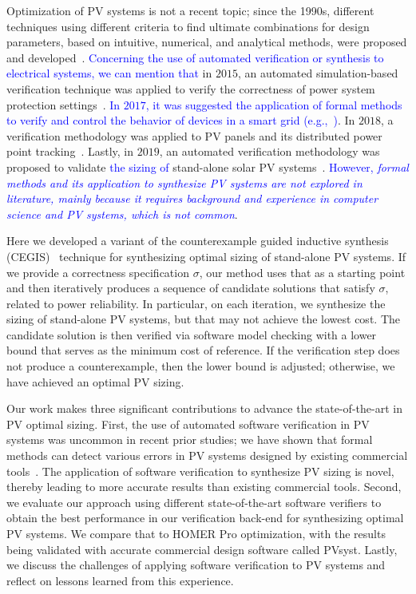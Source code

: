 \documentclass[runningheads]{llncs}
\begin{document}
Optimization of PV systems is not a recent topic; since the 1990s, different techniques using different criteria to find ultimate combinations for design parameters, based on intuitive, numerical, and analytical methods, were proposed and developed~\cite{Alsadi2018}. \textcolor{blue}{Concerning the use of automated verification or synthesis to electrical systems, we can mention that} in $2015$, an automated simulation-based verification technique was applied to verify the correctness of power system protection settings~\cite{Sengupta2015}. \textcolor{blue}{In $2017$, it was suggested the application of formal methods to verify and control the behavior of devices in a smart grid (e.g.,~\cite{Abate2017})}. In $2018$, a verification methodology was applied to PV panels and its distributed power point tracking~\cite{Driouich2018}. Lastly, in $2019$, an automated verification methodology was proposed to validate \textcolor{blue}{the sizing of} stand-alone solar PV systems~\cite{TrindadeCordeiro19}. \textcolor{blue}{However, \textit{formal methods and its application to synthesize PV systems are not explored in literature, mainly because it requires background and experience in computer science and PV systems, which is not common}}.

Here we developed a variant of the counterexample guided inductive synthesis (CEGIS)~\cite{AbateCAV2018} technique for synthesizing optimal sizing of stand-alone PV systems. If we provide a correctness specification $\sigma$, our method uses that as a starting point and then iteratively produces a sequence of candidate solutions that satisfy $\sigma$, related to power reliability. In particular, on each iteration, we synthesize the sizing of stand-alone PV systems, but that may not achieve the lowest cost. The candidate solution is then verified via software model checking with a lower bound that serves as the minimum cost of reference. If the verification step does not produce a counterexample, then the lower bound is adjusted; otherwise, we have achieved an optimal PV sizing.

Our work makes three significant contributions to advance the state-of-the-art in PV optimal sizing. First, the use of automated software verification in PV systems was uncommon in recent prior studies; we have shown that formal methods can detect various errors in PV systems designed by existing commercial tools~\cite{TrindadeCordeiro19}. The application of software verification to synthesize PV sizing is novel, thereby leading to more accurate results than existing commercial tools. Second, we evaluate our approach using different state-of-the-art software verifiers to obtain the best performance in our verification back-end for synthesizing optimal PV systems. We compare that to HOMER Pro optimization, with the results being validated with accurate commercial design software called PVsyst. Lastly, we discuss the challenges of applying software verification to PV systems and reflect on lessons learned from this experience.
\end{document}

